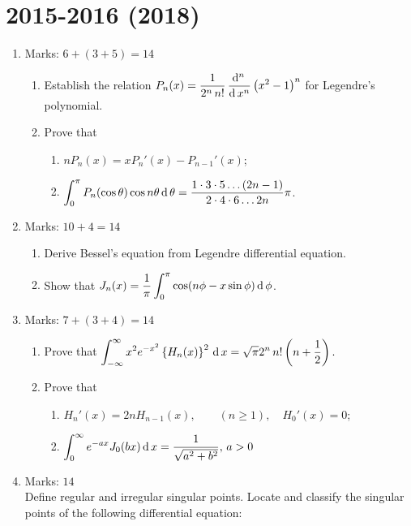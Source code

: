 \documentclass[../main-sheet.tex]{subfiles}
\begin{document}
\section*{2015-2016 (2018)}
\begin{enumerate}
    \item Marks: $ 6+(3+5)=14 $
    \begin{enumerate}
        \item Establish the relation $ \displaystyle P_n(x)=\frac{1}{2^n\,n!}\,\frac{\mathrm{d}^{n}\, }{\mathrm{d}\, x^{n}}\left( x^2-1 \right)^n $ for Legendre's polynomial.
        \item Prove that \begin{enumerate}[label=(\roman*)]
            \item $ nP_n(x)=xP_n'(x)-P_{n-1}'(x) $;
            \item $ \displaystyle\int_0^\pi P_n(\cos \theta)\cos n\theta \,\mathrm{d}\, \theta =\frac{1\cdot3\cdot5\dots(2n-1)}{2\cdot4\cdot6\dots2n}\pi $.
        \end{enumerate}
    \end{enumerate}
    \item Marks: $ 10+4=14 $
    \begin{enumerate}
        \item Derive Bessel's equation from Legendre differential equation.
        \item Show that $ \displaystyle J_n(x)=\frac{1}{\pi}\int_0^\pi \cos(n\phi -x\sin \phi)\,\mathrm{d}\, \phi $.
    \end{enumerate}
    \item Marks: $ 7+(3+4)=14 $
    \begin{enumerate}
        \item Prove that $ \displaystyle \int_{-\infty}^\infty x^2e^{-x^2}\left\{ H_n(x) \right\}^2\,\mathrm{d}\, x=\sqrt{\pi} 2^n\,n!\left( n+\frac{1}{2} \right). $
        \item Prove that
        \begin{enumerate}
            \item $ H_n'(x)=2n H_{n-1}(x),\qquad (n\geq 1),\quad H_0'(x)=0 $;
            \item $ \displaystyle\int_0^\infty e^{-ax}J_0(bx)\,\mathrm{d}\, x=\frac{1}{\sqrt{a^2+b^2}},\,a>0 $
        \end{enumerate}
    \end{enumerate}
    \item Marks: $ 14 $\\
    Define regular and irregular singular points. Locate and classify the singular points of the following differential equation:

\end{enumerate}
\end{document}
